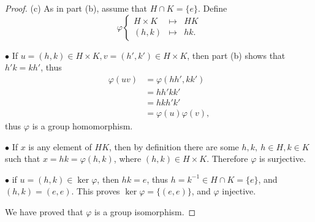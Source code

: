 \documentclass[11pt,a4paper]{article}
\begin{document}
\begin{proof}
\item[(c)]  As in part (b), assume that $H\cap K = \{e\}$. Define
$$
\varphi
\left\{
\begin{array}{ccc}
H \times K & \mapsto & HK\\
(h,k) & \mapsto &hk.
\end{array}
\right.
$$
  \item[$\bullet$] If $u = (h,k) \in H\times K, v = (h',k' )\in H\times K$, then part (b) shows that $h'k = kh'$, thus
  \begin{align*}
  \varphi(uv) &=\varphi(hh',kk')\\
  &= hh'kk'\\
  &=hkh'k'\\
  &=\varphi(u) \varphi(v),
  \end{align*}
thus $\varphi$ is a group homomorphism.

 \item[$\bullet$] If $x$ is any element of $HK$, then by definition there are some $h,k,\ h\in H,k \in K$ such that $x = hk = \varphi(h,k)$, where $(h,k) \in H\times K$. Therefore $\varphi$ is surjective.
 
 \item[$\bullet$] if $u = (h,k) \in \ker \varphi$, then $hk = e$, thus $h = k^{-1} \in H\cap K = \{e\}$, and $(h,k) = (e,e)$. This proves $\ker \varphi = \{(e,e)\}$, and $\varphi$ injective.
 
 We have proved that $\varphi$ is a group isomorphism.
\end{proof}
\end{document}
